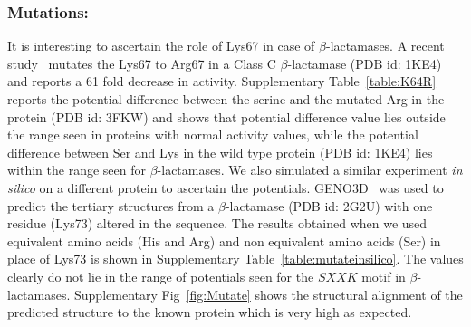 
\subsubsection{\bf Mutations:}
It is interesting to ascertain the role of Lys67 in case of $\beta$-lactamases.
A recent study~\cite{K64R} mutates the Lys67 to Arg67 in a Class C $\beta$-lactamase (PDB id: 1KE4) and reports a 61 fold decrease in activity.
Supplementary Table~\ref{table:K64R} reports the potential difference between the serine and the mutated Arg in the protein (PDB id: 3FKW) and shows that potential difference value lies outside the range seen in proteins with normal activity values, while the  potential difference between Ser and Lys 
in the wild type protein (PDB id: 1KE4) lies within the range seen for $\beta$-lactamases.
We also simulated a similar experiment {\it in silico} on a different protein to ascertain the potentials. 
GENO3D~\cite{GENO3D} was used to predict the tertiary structures from a $\beta$-lactamase (PDB id: 2G2U)  with one residue (Lys73) altered in the sequence. The results obtained 
when we used equivalent amino acids (His and Arg) and non equivalent amino acids (Ser) in place of Lys73
is shown in Supplementary Table~\ref{table:mutateinsilico}. The values clearly do not lie in the range of potentials seen for the $SXXK$ motif in $\beta$-lactamases. 
Supplementary Fig~\ref{fig:Mutate} shows the structural alignment of the predicted structure to the known protein which is very high as expected. 

\pagebreak

